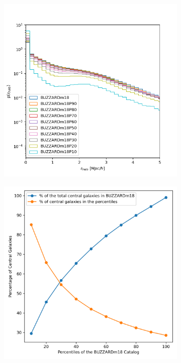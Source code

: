 \begin{figure}[h!]
    \centering
    \begin{subfigure}{0.5\textwidth}
        \centering
        \includegraphics[width=\textwidth]{figures/rhalo_percentile.png}
    \end{subfigure}
    \hfill
    \begin{subfigure}{0.45\textwidth}
        \centering
        \includegraphics[width=\textwidth]{figures/central_gal.png}

\end{subfigure}
\end{figure}
